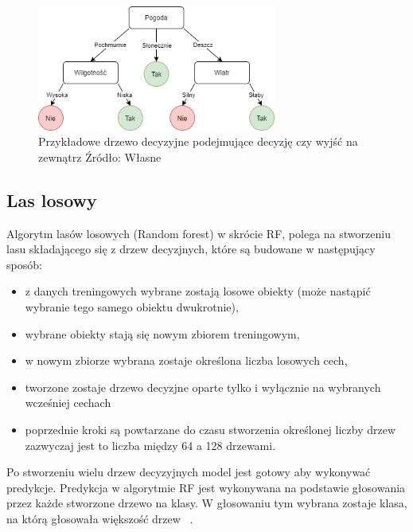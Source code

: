 \begin{figure}[h]
    \centering
    \includegraphics[width=0.7\textwidth]{./Img/BinaryTree.png}
    \caption{Przykładowe drzewo decyzyjne podejmujące decyzję czy wyjść na zewnątrz Źródło: Własne}
\end{figure}

\subsection{Las losowy}
Algorytm lasów losowych (Random forest) w skrócie RF, polega na stworzeniu lasu składającego się z drzew decyzjnych, 
które są budowane w następujący sposób:
\begin{itemize}
    \item z danych treningowych wybrane zostają losowe obiekty (może nastąpić wybranie tego samego obiektu dwukrotnie),
    \item wybrane obiekty stają się nowym zbiorem treningowym,
    \item w nowym zbiorze wybrana zostaje określona liczba losowych cech,
    \item tworzone zostaje drzewo decyzjne oparte tylko i wyłącznie na wybranych wcześniej cechach
    \item poprzednie kroki są powtarzane do czasu stworzenia określonej liczby drzew zazwyczaj jest to 
    liczba między 64 a 128 drzewami. 
\end{itemize}
Po stworzeniu wielu drzew decyzyjnych model jest gotowy aby wykonywać predykcje.
Predykcja w algorytmie RF jest wykonywana na podstawie głosowania przez każde stworzone drzewo na klasy. W głosowaniu 
tym wybrana zostaje klasa, na którą głosowała większość drzew ~\cite{randomforest}.

